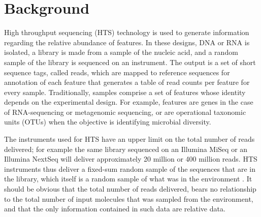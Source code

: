 \documentclass[graybox]{svmult}
\begin{document}

\section{Background}
\label{sec:1}
High throughput sequencing (HTS) technology is used to generate information regarding the relative abundance of features.  In these designs, DNA or RNA is isolated, a library is made from a  sample of the nucleic acid, and a random sample of the library is sequenced on an instrument. The output is a set of short sequence tags, called reads, which are mapped to reference sequences for annotation of each feature that generates a table of read counts per feature for every sample. Traditionally, samples comprise a set of features whose identity depends on the experimental design. For example, features are genes in the case of RNA-sequencing or  metagenomic sequencing, or are operational taxonomic units (OTUs) when the objective is identifying microbial diversity. 
 
The instruments used for HTS have an upper limit on the total number of reads delivered; for example the same library sequenced on an Illumina MiSeq or an Illumina NextSeq will deliver approximately 20 million or 400 million reads. HTS instruments thus deliver a fixed-sum random sample of the sequences that are in the library, which itself is a random sample of what was in the environment \cite{Quinn206425,gloorFrontiers:2017}. It should be obvious that the total number of reads delivered, bears no relationship to the total number of input molecules that was sampled from the environment, and that the only information contained in such data are relative data.
\end{document}
